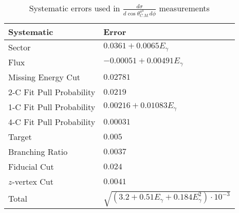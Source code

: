 \begin{table}[h!]
\begin{center}


\caption[Systematics]{\label{tab:systematics}Systematic errors used in $\frac{d\sigma}{d\cos\theta^{\pi^0}_{C.M.} d\phi}$ measurements \vspace{0.75mm}}

\begin{tabular}{p{3.5cm} | p{4.75cm}}
\hline
Systematic & Error \\
\hline
Sector  & $ 0.0361 + 0.0065E_{\gamma}$ \\
Flux  & $ -0.00051 + 0.00491E_{\gamma}$ \\
Missing Energy Cut  & $0.02781$ \\
2-C Fit Pull Probability & $0.0219$ \\
1-C Fit Pull Probability  & $ 0.00216 + 0.01083E_{\gamma}$ \\
4-C Fit Pull Probability  & $0.00031$ \\ 
Target  & $0.005$ \\
Branching Ratio  & $0.0037$ \\
Fiducial Cut & $0.024$ \\
$z$-vertex Cut & $0.0041$ \\
Total & $\sqrt{(3.2 +0.51E_{\gamma} +0.184E_{\gamma}^2)\cdot10^{-3}}$ \\
\hline \hline
\end{tabular}


\end{center}
\end{table}
\vspace{20pt}